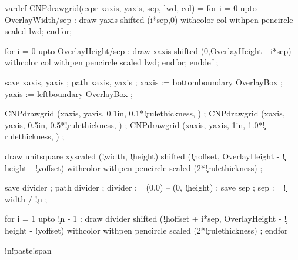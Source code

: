 
\unprotect

\setupcolors[state=start]


\startMPinclusions[+]
  vardef CNPdrawgrid(expr xaxis, yaxis, sep, lwd, col) =
    for i = 0 upto OverlayWidth/sep :
      draw yaxis shifted (i*sep,0) withcolor col withpen pencircle scaled lwd;
    endfor; 

    for i = 0 upto OverlayHeight/sep :
      draw xaxis shifted (0,OverlayHeight - i*sep) withcolor col withpen pencircle scaled lwd;
    endfor; 
  enddef ;
\stopMPinclusions

  save xaxis, yaxis ; path xaxis, yaxis ;
  xaxis := bottomboundary OverlayBox ;
  yaxis := leftboundary   OverlayBox ;

  CNPdrawgrid (xaxis, yaxis, 0.1in, 0.1*\MPvar\c!rulethickness, ) ;
  CNPdrawgrid (xaxis, yaxis, 0.5in, 0.5*\MPvar\c!rulethickness, ) ;
  CNPdrawgrid (xaxis, yaxis, 1in,   1.0*\MPvar\c!rulethickness, ) ;

  draw unitsquare xyscaled (\MPvar\c!width, \MPvar\c!height) 
       shifted (\MPvar\c!hoffset, OverlayHeight - \MPvar\c!height - \MPvar\c!voffset) 
       withcolor 
       withpen pencircle scaled (2*\MPvar\c!rulethickness) ;

  save divider ; path divider ;
  divider := (0,0) -- (0, \MPvar\c!height) ;
  save sep ; sep := \MPvar\c!width / \MPvar\c!n ;

  for i = 1 upto \MPvar\c!n - 1 :
    draw divider
         shifted (\MPvar\c!hoffset + i*sep, 
                  OverlayHeight - \MPvar\c!height - \MPvar\c!voffset) 
     withcolor 
     withpen pencircle scaled (2*\MPvar\c!rulethickness) ;
  endfor 
       

  \ifconditional\cut!n!paste!span

